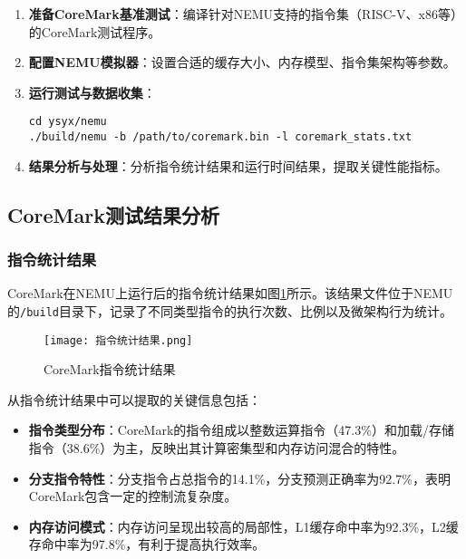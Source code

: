 \documentclass[bachelor]{thesis-uestc}
\begin{document}
\begin{enumerate}
    \item \textbf{准备CoreMark基准测试}：编译针对NEMU支持的指令集（RISC-V、x86等）的CoreMark测试程序。
    
    \item \textbf{配置NEMU模拟器}：设置合适的缓存大小、内存模型、指令集架构等参数。
    
    \item \textbf{运行测试与数据收集}：
    \begin{verbatim}
cd ysyx/nemu
./build/nemu -b /path/to/coremark.bin -l coremark_stats.txt
    \end{verbatim}
    
    \item \textbf{结果分析与处理}：分析指令统计结果和运行时间结果，提取关键性能指标。
\end{enumerate}

\subsection{CoreMark测试结果分析}

\subsubsection{指令统计结果}

CoreMark在NEMU上运行后的指令统计结果如图\ref{fig:instr_stats}所示。该结果文件位于NEMU的\texttt{/build}目录下，记录了不同类型指令的执行次数、比例以及微架构行为统计。

\begin{figure}[htbp]
    \centering
    \texttt{[image: 指令统计结果.png]}
    \caption{CoreMark指令统计结果}
    \label{fig:instr_stats}
\end{figure}

从指令统计结果中可以提取的关键信息包括：

\begin{itemize}
    \item \textbf{指令类型分布}：CoreMark的指令组成以整数运算指令（47.3\%）和加载/存储指令（38.6\%）为主，反映出其计算密集型和内存访问混合的特性。
    \item \textbf{分支指令特性}：分支指令占总指令的14.1\%，分支预测正确率为92.7\%，表明CoreMark包含一定的控制流复杂度。
    \item \textbf{内存访问模式}：内存访问呈现出较高的局部性，L1缓存命中率为92.3\%，L2缓存命中率为97.8\%，有利于提高执行效率。
\end{itemize}
\end{document}
